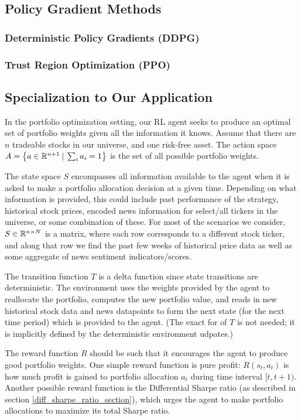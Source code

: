 \subsection{Policy Gradient Methods}



\subsubsection{Deterministic Policy Gradients (DDPG)}

\subsubsection{Trust Region Optimization (PPO)}

\subsection{Specialization to Our Application}

In the portfolio optimization setting, our RL agent seeks to produce an optimal set of portfolio weights given all the information it knows.
Assume that there are $n$ tradeable stocks in our universe, and one risk-free asset.
The action space $A = \left\{a \in \mathbb{R}^{n+1} \:|\: \sum_i a_i = 1\right\}$ is the set of all possible portfolio weights.

The state space $S$ encompasses all information available to the agent when it is asked to make a portfolio allocation decision at a given time.
Depending on what information is provided, this could include past performance of the strategy, historical stock prices, encoded news information for
select/all tickers in the universe, or some combination of these. For most of the scenarios we consider, $S \in \mathbb{R}^{n \times N}$ is a matrix, where
each row corresponds to a different stock ticker, and along that row we find the past few weeks of historical price data as well as some
aggregate of news sentiment indicators/scores.

The transition function $T$ is a delta function since state transitions are deterministic.
The environment uses the weights provided by the agent to reallocate the portfolio, computes the new portfolio value,
and reads in new historical stock data and news datapoints to form the next state (for the next time period) which is provided to the agent.
(The exact for of $T$ is not needed; it is implicitly defined by the deterministic environment udpates.)

The reward function $R$ should be such that it encourages the agent to produce good portfolio weights.
One simple reward function is pure profit: $R(s_t, a_t)$ is how much profit is gained to portfolio allocation $a_t$ during time interval $[t, t+1)$.
Another possible reward function is the Differential Sharpe ratio (as described in section \ref{diff_sharpe_ratio_section}), which urges the agent to make portfolio allocations to maximize its total Sharpe ratio. 



